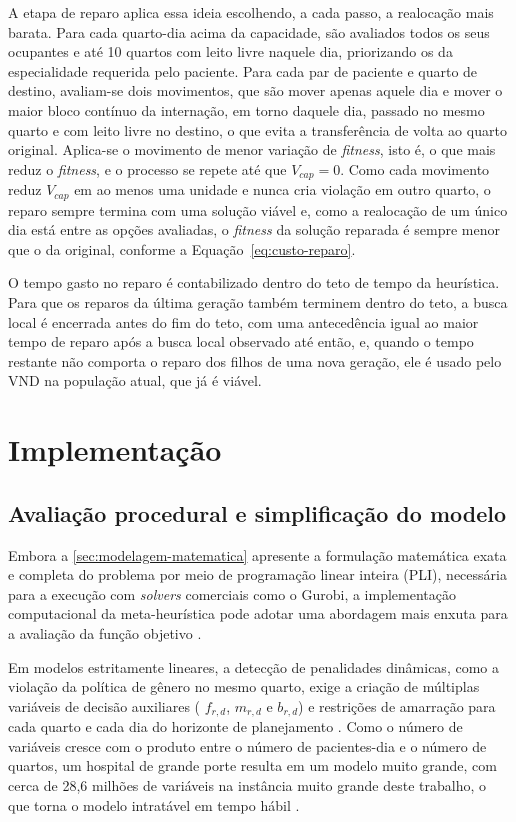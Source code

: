 A etapa de reparo aplica essa ideia escolhendo, a cada passo, a realocação mais barata. Para cada quarto-dia acima da capacidade, são avaliados todos os seus ocupantes e até 10 quartos com leito livre naquele dia, priorizando os da especialidade requerida pelo paciente. Para cada par de paciente e quarto de destino, avaliam-se dois movimentos, que são mover apenas aquele dia e mover o maior bloco contínuo da internação, em torno daquele dia, passado no mesmo quarto e com leito livre no destino, o que evita a transferência de volta ao quarto original. Aplica-se o movimento de menor variação de \textit{fitness}, isto é, o que mais reduz o \textit{fitness}, e o processo se repete até que $V_{cap} = 0$. Como cada movimento reduz $V_{cap}$ em ao menos uma unidade e nunca cria violação em outro quarto, o reparo sempre termina com uma solução viável e, como a realocação de um único dia está entre as opções avaliadas, o \textit{fitness} da solução reparada é sempre menor que o da original, conforme a Equação~\eqref{eq:custo-reparo}.

O tempo gasto no reparo é contabilizado dentro do teto de tempo da heurística. Para que os reparos da última geração também terminem dentro do teto, a busca local é encerrada antes do fim do teto, com uma antecedência igual ao maior tempo de reparo após a busca local observado até então, e, quando o tempo restante não comporta o reparo dos filhos de uma nova geração, ele é usado pelo VND na população atual, que já é viável.



\section{Implementação}
\label{sec:implementacao}

\subsection{Avaliação procedural e simplificação do modelo}

Embora a \autoref{sec:modelagem-matematica} apresente a formulação matemática exata e completa do problema por meio de programação linear inteira (PLI), necessária para a execução com \textit{solvers} comerciais como o Gurobi, a implementação computacional da meta-heurística pode adotar uma abordagem mais enxuta para a avaliação da função objetivo \cite{demeester2010hybrid}.

Em modelos estritamente lineares, a detecção de penalidades dinâmicas, como a violação da política de gênero no mesmo quarto, exige a criação de múltiplas variáveis de decisão auxiliares ( $f_{r,d}$, $m_{r,d}$ e $b_{r,d}$) e restrições de amarração para cada quarto e cada dia do horizonte de planejamento \cite{ceschia2011local}. Como o número de variáveis cresce com o produto entre o número de pacientes-dia e o número de quartos, um hospital de grande porte resulta em um modelo muito grande, com cerca de 28,6 milhões de variáveis na instância muito grande deste trabalho, o que torna o modelo intratável em tempo hábil \cite{demeester2010hybrid}.

